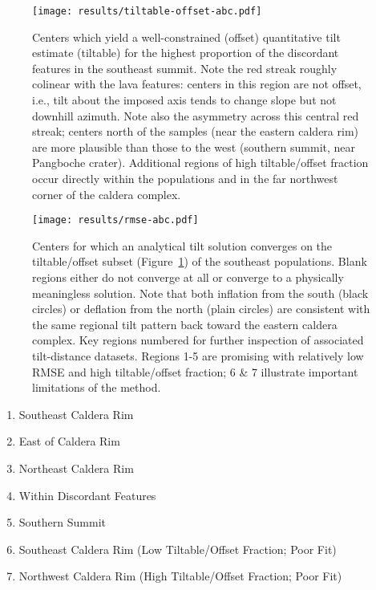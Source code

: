 \begin{figure}
    \texttt{[image: results/tiltable-offset-abc.pdf]}%
    \caption[Centers by tiltable/offset fraction]{Centers which yield a well-constrained (offset) quantitative tilt estimate (tiltable) for the highest proportion of the discordant features in the southeast summit. Note the red streak roughly colinear with the lava features: centers in this region are not offset, i.e., tilt about the imposed axis tends to change slope but not downhill azimuth. Note also the asymmetry across this central red streak; centers north of the samples (near the eastern caldera rim) are more plausible than those to the west (southern summit, near Pangboche crater). Additional regions of high tiltable/offset fraction occur directly within the populations and in the far northwest corner of the caldera complex.}%
    \label{fig:tiltable-offset-abc}
\end{figure}


\begin{figure}
    \texttt{[image: results/rmse-abc.pdf]}%
    \caption[Centers by analytical convergence]{Centers for which an analytical tilt solution converges on the tiltable/offset subset (Figure~\ref{fig:tiltable-offset-abc}) of the southeast populations. Blank regions either do not converge at all or converge to a physically meaningless solution. Note that both inflation from the south (black circles) or deflation from the north (plain circles) are consistent with the same regional tilt pattern back toward the eastern caldera complex. Key regions numbered for further inspection of associated tilt-distance datasets. Regions 1-5 are promising with relatively low \acs{RMSE} and high tiltable/offset fraction; 6 \& 7 illustrate important limitations of the method.}%
    \label{fig:rmse-abc}
\end{figure}

\begin{enumerate}
    \item Southeast Caldera Rim
    \item East of Caldera Rim
    \item Northeast Caldera Rim
    \item Within Discordant Features
    \item Southern Summit
    \item Southeast Caldera Rim (Low Tiltable/Offset Fraction; Poor Fit)
    \item Northwest Caldera Rim (High Tiltable/Offset Fraction; Poor Fit)
\end{enumerate}